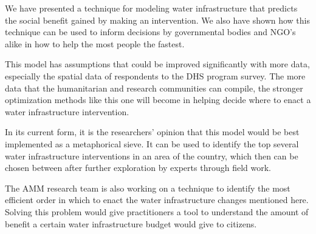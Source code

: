 We have presented a technique for modeling water infrastructure that predicts the social benefit gained by making an intervention. We also have shown how this technique can be used to inform decisions by governmental bodies and NGO's alike in how to help the most people the fastest.

This model has assumptions that could be improved significantly with more data, especially the spatial data of respondents to the DHS program survey. The more data that the humanitarian and research communities can compile, the stronger optimization methods like this one will become in helping decide where to enact a water infrastructure intervention.

In its current form, it is the researchers' opinion that this model would be best implemented as a metaphorical sieve. It can be used to identify the top several water infrastructure interventions in an area of the country, which then can be chosen between after further exploration by experts through field work.

The AMM research team is also working on a technique to identify the most efficient order in which to enact the water infrastructure changes mentioned here. Solving this problem would give practitioners a tool to understand the amount of benefit a certain water infrastructure budget would give to citizens.